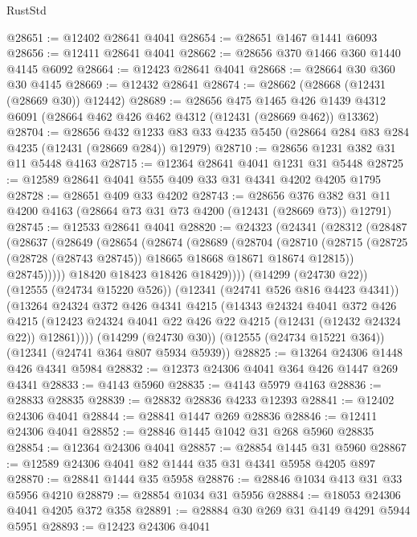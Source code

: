 \begin{lexlean}{RustStd}
\begin{coremodule}
@28651 := @12402 @28641 @4041
@28654 := @28651 @1467 @1441 @6093
@28656 := @12411 @28641 @4041
@28662 := @28656 @370 @1466 @360 @1440 @4145 @6092
@28664 := @12423 @28641 @4041
@28668 := @28664 @30 @360 @30 @4145
@28669 := @12432 @28641
@28674 := @28662 (@28668 (@12431 (@28669 @30)) @12442)
@28689 := @28656
    @475
    @1465
    @426
    @1439
    @4312
    @6091
    (@28664 @462 @426 @462 @4312 (@12431 (@28669 @462)) @13362)
@28704 := @28656
    @432
    @1233
    @83
    @33
    @4235
    @5450
    (@28664 @284 @83 @284 @4235 (@12431 (@28669 @284)) @12979)
@28710 := @28656 @1231 @382 @31 @11 @5448 @4163
@28715 := @12364 @28641 @4041 @1231 @31 @5448
@28725 := @12589 @28641 @4041 @555 @409 @33 @31 @4341 @4202 @4205 @1795
@28728 := @28651 @409 @33 @4202
@28743 := @28656
    @376
    @382
    @31
    @11
    @4200
    @4163
    (@28664 @73 @31 @73 @4200 (@12431 (@28669 @73)) @12791)
@28745 := @12533 @28641 @4041
@28820 := @24323
    (@24341
      (@28312
        (@28487
          (@28637
            (@28649
              (@28654
                (@28674
                  (@28689
                    (@28704
                      (@28710
                        (@28715
                          (@28725 (@28728 (@28743 @28745)) @18665 @18668 @18671 @18674 @12815))
                        @28745)))))
              @18420
              @18423
              @18426
              @18429))))
      (@14299 (@24730 @22))
      (@12555 (@24734 @15220 @526))
      (@12341 (@24741 @526 @816 @4423 @4341))
      (@13264
        @24324
        @372
        @426
        @4341
        @4215
        (@14343
          @24324
          @4041
          @372
          @426
          @4215
          (@12423 @24324 @4041 @22 @426 @22 @4215 (@12431 (@12432 @24324 @22)) @12861))))
    (@14299 (@24730 @30))
    (@12555 (@24734 @15221 @364))
    (@12341 (@24741 @364 @807 @5934 @5939))
@28825 := @13264 @24306 @1448 @426 @4341 @5984
@28832 := @12373 @24306 @4041 @364 @426 @1447 @269 @4341
@28833 := @4143 @5960
@28835 := @4143 @5979 @4163
@28836 := @28833 @28835
@28839 := @28832 @28836 @4233 @12393
@28841 := @12402 @24306 @4041
@28844 := @28841 @1447 @269 @28836
@28846 := @12411 @24306 @4041
@28852 := @28846 @1445 @1042 @31 @268 @5960 @28835
@28854 := @12364 @24306 @4041
@28857 := @28854 @1445 @31 @5960
@28867 := @12589 @24306 @4041 @82 @1444 @35 @31 @4341 @5958 @4205 @897
@28870 := @28841 @1444 @35 @5958
@28876 := @28846 @1034 @413 @31 @33 @5956 @4210
@28879 := @28854 @1034 @31 @5956
@28884 := @18053 @24306 @4041 @4205 @372 @358
@28891 := @28884 @30 @269 @31 @4149 @4291 @5944 @5951
@28893 := @12423 @24306 @4041

\end{coremodule}
\end{lexlean}
